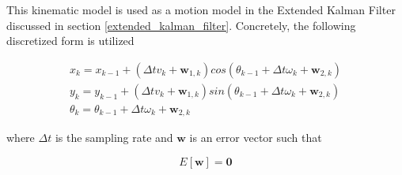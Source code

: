This kinematic model is used as a motion model in the Extended Kalman Filter discussed in section \ref{extended_kalman_filter}. Concretely, the following discretized 
form is utilized 


\begin{eqnarray}
x_k = x_{k-1} + (\Delta t v_k + \mathbf{w}_{1,k})cos(\theta_{k-1} +  \Delta t \omega_k + \mathbf{w}_{2,k}) \\
y_k = y_{k-1} + (\Delta t v_k + \mathbf{w}_{1,k})sin(\theta_{k-1} +  \Delta t \omega_k + \mathbf{w}_{2,k}) \\
\theta_k = \theta_{k -1} + \Delta t \omega_k + \mathbf{w}_{2,k}
\label{odisseus_discrete}
\end{eqnarray}

where $\Delta t$ is the sampling rate and $\mathbf{w}$ is an error vector such that

\begin{equation}
E[\mathbf{w}] = \mathbf{0}
\end{equation}